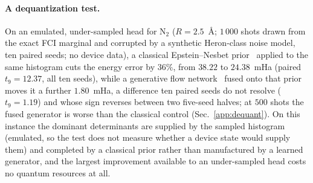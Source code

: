 \paragraph{A dequantization test.} On an emulated, under-sampled head for $\mathrm{N_2}$ ($R=2.5$~\AA; $1\,000$ shots drawn from the exact FCI marginal and corrupted by a synthetic Heron-class noise model, ten paired seeds; no device data), a classical Epstein--Nesbet prior~\cite{cipsi1973} applied to the same histogram cuts the energy error by $36\%$, from $38.22$ to $24.38$~mHa (paired $t_9=12.37$, all ten seeds), while a generative flow network~\cite{bengio2021} fused onto that prior moves it a further $1.80$~mHa, a difference ten paired seeds do not resolve ($t_9=1.19$) and whose sign reverses between two five-seed halves; at $500$ shots the fused generator is worse than the classical control (Sec.~\ref{app:dequant}). On this instance the dominant determinants are supplied by the sampled histogram (emulated, so the test does not measure whether a device state would supply them) and completed by a classical prior rather than manufactured by a learned generator, and the largest improvement available to an under-sampled head costs no quantum resources at all.
